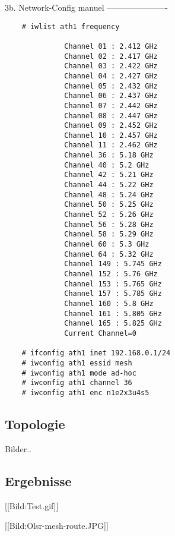 3b. Network-Config manuel
----------------------
\begin{verbatim}
	# iwlist ath1 frequency
	
	          Channel 01 : 2.412 GHz
	          Channel 02 : 2.417 GHz
	          Channel 03 : 2.422 GHz
	          Channel 04 : 2.427 GHz
	          Channel 05 : 2.432 GHz
	          Channel 06 : 2.437 GHz
	          Channel 07 : 2.442 GHz
	          Channel 08 : 2.447 GHz
	          Channel 09 : 2.452 GHz
	          Channel 10 : 2.457 GHz
	          Channel 11 : 2.462 GHz
	          Channel 36 : 5.18 GHz
	          Channel 40 : 5.2 GHz
	          Channel 42 : 5.21 GHz
	          Channel 44 : 5.22 GHz
	          Channel 48 : 5.24 GHz
	          Channel 50 : 5.25 GHz
	          Channel 52 : 5.26 GHz
	          Channel 56 : 5.28 GHz
	          Channel 58 : 5.29 GHz
	          Channel 60 : 5.3 GHz
	          Channel 64 : 5.32 GHz
	          Channel 149 : 5.745 GHz
	          Channel 152 : 5.76 GHz
	          Channel 153 : 5.765 GHz
	          Channel 157 : 5.785 GHz
	          Channel 160 : 5.8 GHz
	          Channel 161 : 5.805 GHz
	          Channel 165 : 5.825 GHz
	          Current Channel=0
	
	# ifconfig ath1 inet 192.168.0.1/24	
	# iwconfig ath1 essid mesh
	# iwconfig ath1 mode ad-hoc
	# iwconfig ath1 channel 36
	# iwconfig ath1 enc n1e2x3u4s5
\end{verbatim}

\subsection{Topologie}

Bilder..


\subsection{Ergebnisse}

[[Bild:Test.gif]]

[[Bild:Olsr-mesh-route.JPG]]




\begin{verbatim}

\end{verbatim}